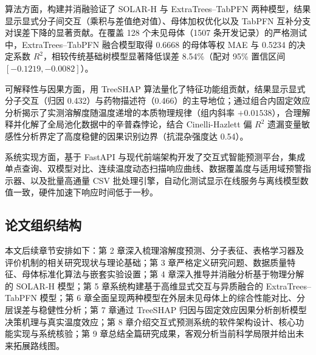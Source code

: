 算法方面，构建并消融验证了 SOLAR-H 与 ExtraTrees--TabPFN 两种模型，结果显示显式分子间交互（乘积与差值绝对值）、母体加权优化以及 TabPFN 互补分支对误差下降的显著贡献。在覆盖 128 个未见母体（1507 条开发记录）的严格测试中，ExtraTrees--TabPFN 融合模型取得 0.6668 的母体等权 MAE 与 0.5234 的决定系数 $R^2$，相较传统基础树模型显著降低误差 8.54\%（配对 95\% 置信区间 $[-0.1219, -0.0082]$\cite{extratrees2006,tabpfn2025}）。

可解释性与因果方面，用 TreeSHAP 算法量化了特征功能组贡献，结果显示显式分子交互（归因 0.432）与药物描述符（0.466）的主导地位\cite{treeshap2020}；通过组合内固定效应分析揭示了实测溶解度随温度递增的本质物理规律（组内斜率 $+0.01538$），合理解释并化解了全局池化数据中的辛普森悖论，结合 Cinelli-Hazlett 偏 $R^2$ 遗漏变量敏感性分析界定了高度稳健的因果识别边界（抗混杂强度达 0.54\cite{pearl2009,sensitivity2020}）。

系统实现方面，基于 FastAPI 与现代前端架构开发了交互式智能预测平台，集成单点查询、双模型对比、连续温度动态扫描响应曲线、数据覆盖度与适用域预警指示器、以及批量高通量 CSV 批处理引擎，自动化测试显示在线服务与离线模型数值一致，硬件加速下响应时间低于一秒。

\subsection{论文组织结构}

本文后续章节安排如下：第 2 章深入梳理溶解度预测、分子表征、表格学习器及评价机制的相关研究现状与理论基础；第 3 章严格定义研究问题、数据质量特征、母体标准化算法与嵌套实验设置；第 4 章深入推导并消融分析基于物理分解的 SOLAR-H 模型；第 5 章系统构建基于高维显式交互与异质融合的 ExtraTrees--TabPFN 模型；第 6 章全面呈现两种模型在外层未见母体上的综合性能对比、分层误差与稳健性分析；第 7 章通过 TreeSHAP 归因与固定效应因果分析剖析模型决策机理与真实温度效应；第 8 章介绍交互式预测系统的软件架构设计、核心功能实现与系统核验；第 9 章总结全篇研究成果，客观分析当前科学局限并给出未来拓展路线图。